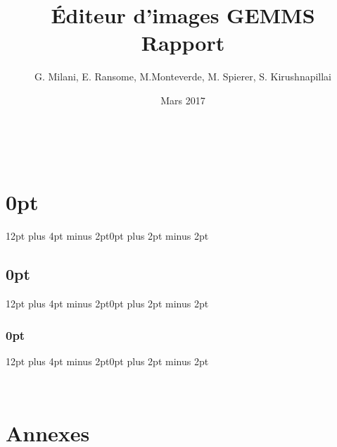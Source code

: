 \documentclass[11pt, a4paper, french, twoside]{article}
\title{Éditeur d'images GEMMS \\ Rapport}
\author{G. Milani, E. Ransome, M.Monteverde, M. Spierer, S. Kirushnapillai}
\date{Mars 2017}
\begin{document}
\graphicspath{ {img/} }

\newcommand{\HRule}{\rule{\linewidth}{0.5mm}}


\newpage~


\thispagestyle{empty}
\newpage


\tableofcontents
\newpage
\listoffigures
\newpage


\listoffigures
\newpage


\renewcommand{\arraystretch}{1.5}

\setlength{\parskip}{1em}
\setlength{\parindent}{0pt}

\titlespacing\section{0pt}{12pt plus 4pt minus 2pt}{0pt plus 2pt minus 2pt}
\titlespacing\subsection{0pt}{12pt plus 4pt minus 2pt}{0pt plus 2pt minus 2pt}
\titlespacing\subsubsection{0pt}{12pt plus 4pt minus 2pt}{0pt plus 2pt minus 2pt}


~
\thispagestyle{empty}
\setcounter{page}{0}
\newpage












\newpage
\glsaddall
\printglossary[toctitle=Glossaire]

\newpage

\nocite{*}




\section{Annexes}
\appendix

\end{document}

